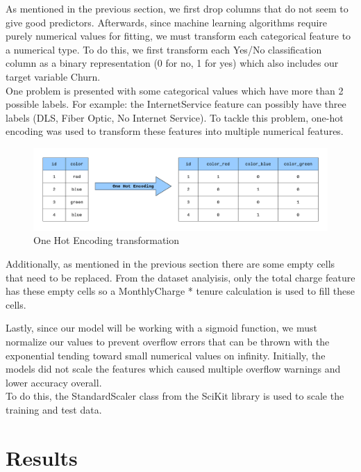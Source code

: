 \documentclass[letterpaper, 10 pt, conference]{ieeeconf}
\begin{document}
As mentioned in the previous section, we first drop columns that do not seem to give good predictors. Afterwards, since machine learning 
algorithms require purely numerical values for fitting, we must transform each categorical feature to a numerical type. To do this, we first
transform each Yes/No classification column as a binary representation (0 for no, 1 for yes) which also includes our target variable Churn.  \\

One problem is presented with some categorical values which have more than 2 possible labels. For example: the InternetService feature can possibly
have three labels (DLS, Fiber Optic, No Internet Service). To tackle this problem, one-hot encoding was used to transform these features into multiple 
numerical features. \\

\begin{figure}[thpb]
    \centering
    \includegraphics[scale=0.2]{figures/one_hot.png}
    \caption{One Hot Encoding transformation}
    \label{one_hot}
 \end{figure}

Additionally, as mentioned in the previous section there are some empty cells that need to be replaced. From the dataset analyisis, only the total charge feature has
these empty cells so a MonthlyCharge * tenure calculation is used to fill these cells.


Lastly, since our model will be working with a sigmoid function, we must normalize our values to prevent overflow errors that can be thrown with the exponential tending toward small numerical values on infinity.
Initially, the models did not scale the features which caused multiple overflow warnings and lower accuracy overall. \\

To do this, the StandardScaler class from the SciKit library is used to scale the training and test data.

\section{ Results }
\end{document}
